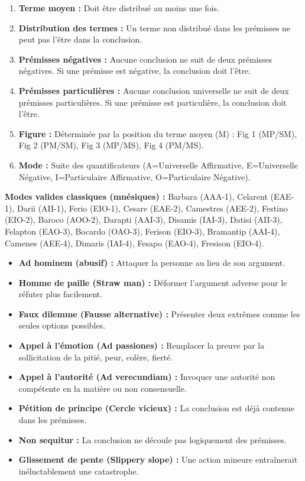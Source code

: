 \documentclass[11pt]{article}
\begin{document}
\begin{propriete}
\begin{enumerate}
    \item \textbf{Terme moyen :} Doit être distribué au moins une fois.
    \item \textbf{Distribution des termes :} Un terme non distribué dans les prémisses ne peut pas l'être dans la conclusion.
    \item \textbf{Prémisses négatives :} Aucune conclusion ne suit de deux prémisses négatives. Si une prémisse est négative, la conclusion doit l'être.
    \item \textbf{Prémisses particulières :} Aucune conclusion universelle ne suit de deux prémisses particulières. Si une prémisse est particulière, la conclusion doit l'être.
    \item \textbf{Figure :} Déterminée par la position du terme moyen (M) : Fig 1 (MP/SM), Fig 2 (PM/SM), Fig 3 (MP/MS), Fig 4 (PM/MS).
    \item \textbf{Mode :} Suite des quantificateurs (A=Universelle Affirmative, E=Universelle Négative, I=Particulaire Affirmative, O=Particulaire Négative).
\end{enumerate}
\textbf{Modes valides classiques (mnésiques) :} Barbara (AAA-1), Celarent (EAE-1), Darii (AII-1), Ferio (EIO-1), Cesare (EAE-2), Camestres (AEE-2), Festino (EIO-2), Baroco (AOO-2), Darapti (AAI-3), Disamis (IAI-3), Datisi (AII-3), Felapton (EAO-3), Bocardo (OAO-3), Ferison (EIO-3), Bramantip (AAI-4), Camenes (AEE-4), Dimaris (IAI-4), Fesapo (EAO-4), Fresison (EIO-4).
\end{propriete}

\begin{aretenir}
\begin{itemize}
    \item \textbf{Ad hominem (abusif) :} Attaquer la personne au lieu de son argument.
    \item \textbf{Homme de paille (Straw man) :} Déformer l'argument adverse pour le réfuter plus facilement.
    \item \textbf{Faux dilemme (Fausse alternative) :} Présenter deux extrêmes comme les seules options possibles.
    \item \textbf{Appel à l'émotion (Ad passiones) :} Remplacer la preuve par la sollicitation de la pitié, peur, colère, fierté.
    \item \textbf{Appel à l'autorité (Ad verecundiam) :} Invoquer une autorité non compétente en la matière ou non consensuelle.
    \item \textbf{Pétition de principe (Cercle vicieux) :} La conclusion est déjà contenue dans les prémisses.
    \item \textbf{Non sequitur :} La conclusion ne découle pas logiquement des prémisses.
    \item \textbf{Glissement de pente (Slippery slope) :} Une action mineure entraînerait inéluctablement une catastrophe.
\end{itemize}
\end{aretenir}
\end{document}
